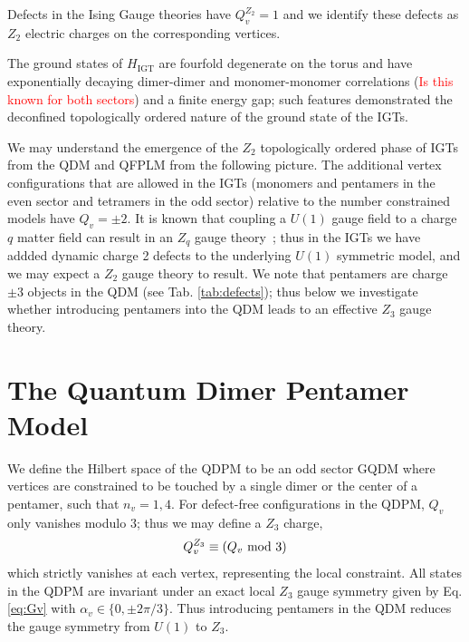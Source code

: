 \documentclass[twocolumn,prb,aps,floatfix,superscriptaddress]{revtex4-1}
\newcommand{\tabref}[1]{Tab. \ref{#1}}
\newcommand{\Eqref}[1]{Eq. \eqref{#1}}
\newcommand{\HIGT}{H_\mathrm{IGT}}
\begin{document}
Defects in the Ising Gauge theories have $Q_v^{Z_2} = 1$ and we identify these defects as $Z_2$ electric charges on the corresponding vertices. 

The ground states of $\HIGT$ are fourfold degenerate on the torus and have exponentially decaying dimer-dimer and monomer-monomer correlations (\textcolor{red}{Is this known for both sectors}) and a finite energy gap; such features demonstrated the deconfined topologically ordered nature of the ground state of the IGTs.

We may understand the emergence of the $Z_2$ topologically ordered phase of IGTs from the QDM and QFPLM from the following picture. The additional vertex configurations that are allowed in the IGTs (monomers and pentamers in the even sector and tetramers in the odd sector) relative to the number constrained models have $Q_v = \pm 2$. It is known that coupling a $U(1)$ gauge field to a charge $q$ matter field can result in an $Z_q$ gauge theory~\cite{Fradkin1979}; thus in the IGTs we have addded dynamic charge 2 defects to the underlying $U(1)$ symmetric model, and we may expect a $Z_2$ gauge theory to result. We note that pentamers are charge $\pm3$ objects in the QDM (see \tabref{tab:defects}); thus below we investigate whether introducing pentamers into the QDM leads to an effective $Z_3$ gauge theory.


\section{The Quantum Dimer Pentamer Model}

We define the Hilbert space of the QDPM to be an odd sector GQDM where vertices are constrained to be touched by a single dimer or the center of a pentamer, such that $n_v = 1,4$. For defect-free configurations in the QDPM, $Q_v$ only vanishes modulo $3$;  thus we may define a $Z_3$ charge,
\begin{equation}
Q_v^{Z_3} \equiv \left(Q_v~\rm{mod}~3\right)
\end{equation}
 which strictly vanishes at each vertex, representing the local constraint. All states in the QDPM are invariant under an exact local $Z_3$ gauge symmetry given by \Eqref{eq:Gv} with $\alpha_v \in \{0,\pm 2\pi/3\}$. Thus introducing pentamers in the QDM reduces the gauge symmetry from $U(1)$ to $Z_3$.
\end{document}
